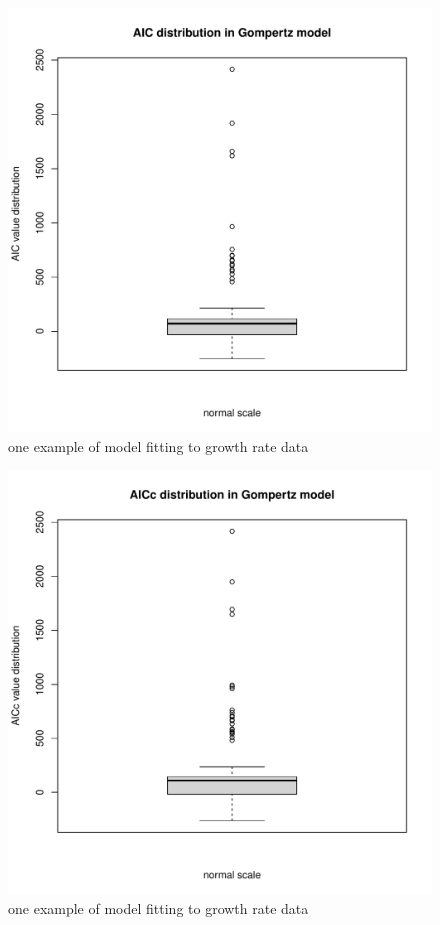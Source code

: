 \documentclass[11pt]{article}
\begin{document}
\begin{figure}[H]
    \centering
    \includegraphics[scale=0.3]{GomAIC_norm.pdf}
    \caption{one example of model fitting to growth rate data}
    \label{fig.7}
\end{figure}

\begin{figure}[H]
    \centering
    \includegraphics[scale=0.3]{GomAICc_norm.pdf}
    \caption{one example of model fitting to growth rate data}
    \label{fig.8}
\end{figure}
\end{document}
